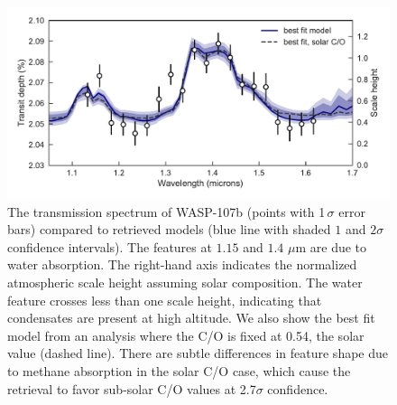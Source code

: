 \documentclass[twocolumn, trackchanges]{aastex61}
\begin{document}
\begin{figure}
\includegraphics[width = \textwidth]{fig2_spectrum.pdf}
\caption{The transmission spectrum of WASP-107b (points with 1\,$\sigma$ error bars) compared to retrieved models (blue line with shaded $1$ and $2\sigma$ confidence intervals). The features at $1.15$ and $1.4$ $\mu$m are due to water absorption. The right-hand axis indicates the normalized atmospheric scale height assuming solar composition. The water feature crosses less than one scale height, indicating that condensates are present at high altitude. We also show the best fit model from an analysis where the C/O is fixed at 0.54, the solar value (dashed line). There are subtle differences in feature shape due to methane absorption in the solar C/O case, which cause the retrieval to favor sub-solar C/O values at 2.7$\sigma$ confidence.} 
\label{fig:spectrum}
\end{figure}
\end{document}
